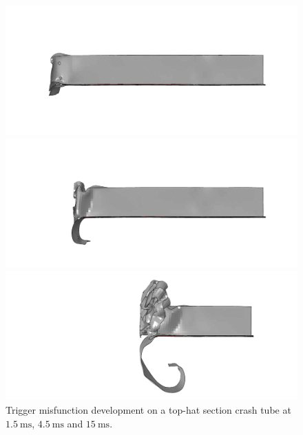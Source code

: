 \documentclass[
documentsize = a4, %
font = cmr, %
typesize = 11, %
printmode = true,
onehalfspacing = true,
language = en, %
titlepage = udciccp, %
degree = pt, %
dedication = true,
acknowledgements = true,
abstract-en = true,
abstract-es = false,
abstract-ga = false,
epigraphs = true,
toc = true,
lof = true,
lot = true,
frontmatterintoc = false,
notation = false,
minimal = false,
]{UDCthesis}
\begin{document}
\begin{figure}
	\centering
	\begin{minipage}[b]{.65\linewidth}
		\includegraphics[width=\linewidth]{IMG_CUTRES/trig_misf_A1}
	\end{minipage}
	\quad
	\begin{minipage}[b]{.65\linewidth}
		\includegraphics[width=\linewidth]{IMG_CUTRES/trig_misf_A2}
	\end{minipage}
	\quad
	\begin{minipage}[b]{.65\linewidth}
		\includegraphics[width=\linewidth]{IMG_CUTRES/trig_misf_A3}
	\end{minipage}
	\caption{Trigger misfunction development on a top-hat section crash tube at $\SI{1.5}{\ms}$, $\SI{4.5}{\ms}$ and $\SI{15}{\ms}$.}
	\label{fig:trig_misf_A}
\end{figure}
\end{document}
